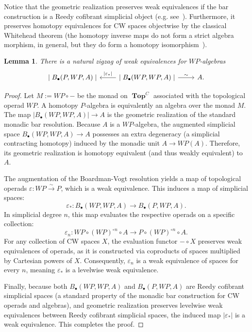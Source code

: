 \documentclass{amsart}
\newtheorem{lemma}[formula]{Lemma}
\theoremstyle{definition}
\theoremstyle{remark}
\newcommand{\eps}{\varepsilon}
\DeclareMathOperator{\Top}{\mathbf{Top}}
\begin{document}
	Notice that the geometric realization preserves weak equivalences if the bar construction is a Reedy cofibrant simplicial object (e.g. see~\cite[Ch.14]{ri-14}). 
	Furthermore, it preserves homotopy equivalences for CW spaces objectwise by the classical Whitehead theorem (the homotopy inverse maps do not form a strict algebra morphism, in general, but they do form a homotopy isomorphism~\cite{be-mo-06}).
	
	\begin{lemma}\label{lm:rectzag}
		There is a natural zigzag of weak equivalences for $W P$-algebras
		\[
		\begin{tikzcd}
			\mid B_{\bullet}(P,WP,A)\mid &
			\mid B_{\bullet}(WP,WP,A)\mid \arrow[swap]{l}{\mid\eps_{*}\mid}\arrow{r}{\sim} &
			A.
		\end{tikzcd}
		\]
	\end{lemma}
	\begin{proof}
		Let $M := WP \circ -$ be the monad on $\Top^C$ associated with the topological operad $WP$. 
		A homotopy $P$-algebra is equivalently an algebra over the monad $M$. The map $|B_\bullet(WP, WP, A)| \to A$ is the geometric realization of the standard monadic bar resolution. 
		Because $A$ is a $WP$-algebra, the augmented simplicial space $B_\bullet(WP, WP, A) \to A$ possesses an extra degeneracy (a simplicial contracting homotopy) induced by the monadic unit $A \to WP(A)$. 
		Therefore, its geometric realization is homotopy equivalent (and thus weakly equivalent) to $A$.
		
		The augmentation of the Boardman-Vogt resolution yields a map of topological operads $\varepsilon \colon WP \xrightarrow{\sim} P$, which is a weak equivalence. 
		This induces a map of simplicial spaces:
		\[
		\varepsilon_* \colon B_\bullet(WP, WP, A) \to B_\bullet(P, WP, A).
		\]
		In simplicial degree $n$, this map evaluates the respective operads on a specific collection:
		\[
		\varepsilon_n \colon WP \circ (WP)^{\circ n} \circ A \to 	P \circ (WP)^{\circ n} \circ A.
		\]
		For any collection of CW spaces $X$, the evaluation functor $- \circ X$ preserves weak equivalences of operads, as it is constructed via coproducts of spaces multiplied by Cartesian powers of $X$. 
		Consequently, $\varepsilon_n$ is a weak equivalence of spaces for every $n$, meaning $\varepsilon_*$ is a levelwise weak equivalence.
		
		Finally, because both $B_\bullet(WP, WP, A)$ and $B_\bullet(P, WP, A)$ are Reedy cofibrant simplicial spaces (a standard property of the monadic bar construction for CW operads and algebras), and geometric realization preserves levelwise weak equivalences between Reedy cofibrant simplicial spaces, the induced map $|\eps_*|$ is a weak equivalence. 
		This completes the proof.
	\end{proof}
	
\end{document}
